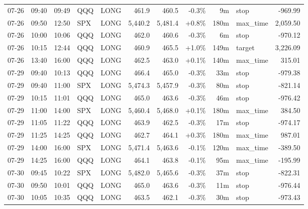 \documentclass[11pt,a4paper,twoside]{article}
\begin{document}
\begin{center}
\begin{longtable}{>{\color{txtmain}}l l l l l r r r r >{\color{txtmain}}l r}
07-26 & 09:40 & 09:49 & QQQ & LONG & 461.9 & 460.5 & \textcolor{lossred}{-0.3\%} & 9m & stop & \textcolor{lossred}{-969.99} \\
07-26 & 09:50 & 12:50 & SPX & LONG & 5,440.2 & 5,481.4 & \textcolor{wingreen}{+0.8\%} & 180m & max\_time & \textcolor{wingreen}{2,059.50} \\
07-26 & 10:00 & 10:06 & QQQ & LONG & 462.0 & 460.6 & \textcolor{lossred}{-0.3\%} & 6m & stop & \textcolor{lossred}{-970.12} \\
07-26 & 10:15 & 12:44 & QQQ & LONG & 460.9 & 465.5 & \textcolor{wingreen}{+1.0\%} & 149m & target & \textcolor{wingreen}{3,226.09} \\
07-26 & 13:40 & 16:00 & QQQ & LONG & 462.5 & 463.0 & \textcolor{wingreen}{+0.1\%} & 140m & max\_time & \textcolor{wingreen}{315.01} \\
07-29 & 09:40 & 10:13 & QQQ & LONG & 466.4 & 465.0 & \textcolor{lossred}{-0.3\%} & 33m & stop & \textcolor{lossred}{-979.38} \\
07-29 & 09:40 & 11:00 & SPX & LONG & 5,474.3 & 5,457.9 & \textcolor{lossred}{-0.3\%} & 80m & stop & \textcolor{lossred}{-821.14} \\
07-29 & 10:15 & 11:01 & QQQ & LONG & 465.0 & 463.6 & \textcolor{lossred}{-0.3\%} & 46m & stop & \textcolor{lossred}{-976.42} \\
07-29 & 11:00 & 14:00 & SPX & LONG & 5,460.4 & 5,468.0 & \textcolor{wingreen}{+0.1\%} & 180m & max\_time & \textcolor{wingreen}{384.50} \\
07-29 & 11:05 & 11:22 & QQQ & LONG & 463.9 & 462.5 & \textcolor{lossred}{-0.3\%} & 17m & stop & \textcolor{lossred}{-974.17} \\
07-29 & 11:25 & 14:25 & QQQ & LONG & 462.7 & 464.1 & \textcolor{wingreen}{+0.3\%} & 180m & max\_time & \textcolor{wingreen}{987.01} \\
07-29 & 14:00 & 16:00 & SPX & LONG & 5,471.4 & 5,463.6 & \textcolor{lossred}{-0.1\%} & 120m & max\_time & \textcolor{lossred}{-389.50} \\
07-29 & 14:25 & 16:00 & QQQ & LONG & 464.1 & 463.8 & \textcolor{lossred}{-0.1\%} & 95m & max\_time & \textcolor{lossred}{-195.99} \\
07-30 & 09:45 & 10:22 & SPX & LONG & 5,482.0 & 5,465.6 & \textcolor{lossred}{-0.3\%} & 37m & stop & \textcolor{lossred}{-822.31} \\
07-30 & 09:50 & 10:01 & QQQ & LONG & 465.0 & 463.6 & \textcolor{lossred}{-0.3\%} & 11m & stop & \textcolor{lossred}{-976.44} \\
07-30 & 10:05 & 10:35 & QQQ & LONG & 463.5 & 462.1 & \textcolor{lossred}{-0.3\%} & 30m & stop & \textcolor{lossred}{-973.43} \\

\end{longtable}
\end{center}
\end{document}
